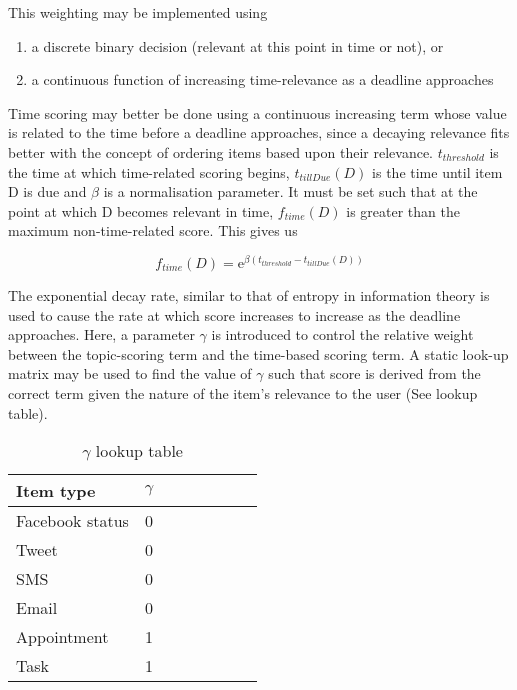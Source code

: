 This weighting may be implemented using 
\begin{enumerate}
  \item a discrete binary decision (relevant at this point in time or not), or 
  \item a continuous function of increasing time-relevance as a deadline approaches
\end{enumerate}

Time scoring may better be done using a continuous increasing term whose value is related to the time before a deadline approaches, since a decaying relevance fits better with the concept of ordering items based upon their relevance. $t_{threshold}$ is the time at which time-related scoring begins, $t_{tillDue}(D)$ is the time until item D is due and $\beta$ is a normalisation parameter. It must be set such that at the point at which D becomes relevant in time, $f_{time}(D)$ is greater than the maximum non-time-related score. This gives us

\begin{equation}\label{BasicTimeScoringRule}
	f_{time} (D) = {\mathrm{e}}^{\beta (t_{threshold}-t_{tillDue}(D))}
\end{equation}

The exponential decay rate, similar to that of entropy in information theory is used to cause the rate at which score increases to increase as the deadline approaches. 
Here, a parameter $\gamma$ is introduced to control the relative weight between the topic-scoring term and the time-based scoring term. A static look-up matrix may be used to find the value of $\gamma$ such that score is derived from the correct term given the nature of the item's relevance to the user (See lookup table).

\begin{table}\label{BetaLookup}
\begin{center}
	\begin{tabular}{l*{6}{c}r}
		Item type        & $\gamma$ \\
		\hline
		Facebook status  & 0 \\
		Tweet            & 0 \\
		SMS          	 & 0 \\
		Email    		 & 0 \\
		Appointment      & 1 \\
		Task		     & 1 \\
	\end{tabular}
	\caption{$\gamma$ lookup table}
\end{center}
\end{table}

